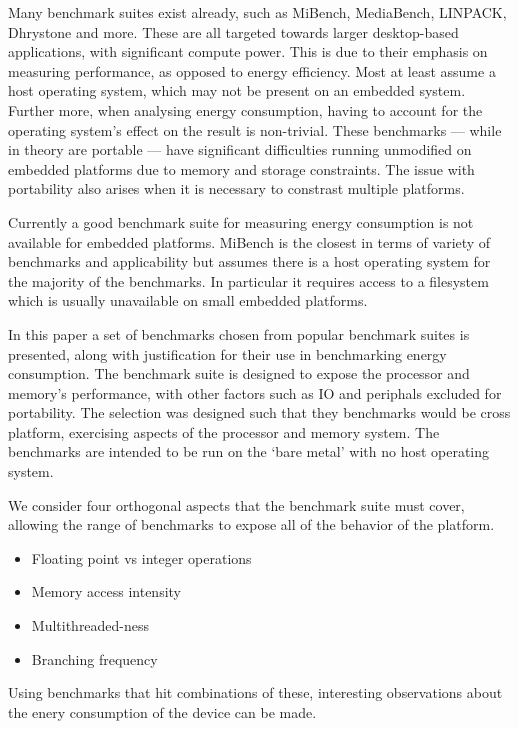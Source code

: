 \documentclass[twocolumn]{article}
\begin{document}
Many benchmark suites exist already, such as MiBench\cite{Guthaus2001}, MediaBench\cite{Fritts2009}, LINPACK\cite{Dongarra2003}, Dhrystone\cite{Weicker1988} and more. These are all targeted towards larger desktop-based applications, with significant compute power. This is due to their emphasis on measuring performance, as opposed to energy efficiency. Most at least assume a host operating system, which may not be present on an embedded system. Further more, when analysing energy consumption, having to account for the operating system’s effect on the result is non-trivial. These benchmarks --- while in theory are portable --- have significant difficulties running unmodified on embedded platforms due to memory and storage constraints. The issue with portability also arises when it is necessary to constrast multiple platforms.

Currently a good benchmark suite for measuring energy consumption is not available for embedded platforms. MiBench is the closest in terms of variety of benchmarks and applicability but assumes there is a host operating system for the majority of the benchmarks. In particular it requires access to a filesystem which is usually unavailable on small embedded platforms.

In this paper a set of benchmarks chosen from popular benchmark suites is presented, along with justification for their use in benchmarking energy consumption. The benchmark suite is designed to expose the processor and memory's performance, with other factors such as IO and periphals excluded for portability. The selection was designed such that they benchmarks would be cross platform, exercising aspects of the processor and memory system. The benchmarks are intended to be run on the ‘bare metal’ with no host operating system.

We consider four orthogonal aspects that the benchmark suite must cover, allowing the range of benchmarks to expose all of the behavior of the platform.

\begin{itemize}
	\setlength{\itemsep}{-0.25em}
	\item Floating point vs integer operations
	\item Memory access intensity
	\item Multithreaded-ness
	\item Branching frequency
\end{itemize}

Using benchmarks that hit combinations of these, interesting observations about the enery consumption of the device can be made.
\end{document}
